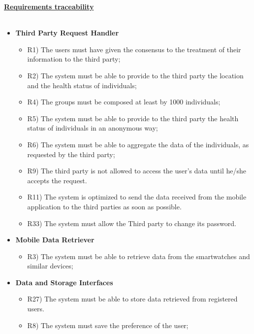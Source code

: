	\underline{\textbf{Requirements traceability}}\\\\
	\begin{itemize}
		\item \textbf{Third Party Request Handler}
		\begin{itemize}
			\item R1) The users must have given the consensus to the treatment of their information to the third party;\\
			\item R2) The system must be able to provide to the third party the location and the health status of individuals;
			\item R4) The groups must be composed at least by 1000 individuals;\\
			\item R5) The system must be able to provide to the third party the health status of individuals in an anonymous way;\\
			\item R6) The system must be able to aggregate the data of the individuals, as requested by the third party;\\
			\item R9) The third party is not allowed to access the user’s data until he/she accepts the request.\\
			\item R11) The system is optimized to send the data received from the mobile application to the third parties as soon as possible.\\
			\item R33) The system must allow the Third party to change its password.\\
		\end{itemize}
		\item \textbf{Mobile Data Retriever}
		\begin{itemize}
			\item R3) The system must be able to retrieve data from the smartwatches and similar devices;\\
		\end{itemize}
		\item \textbf{Data and Storage Interfaces}
		\begin{itemize}
			\item R27) The system must be able to store data retrieved from registered users.\\
			\item R8) The system must save the preference of the user;\\

\end{itemize}
\end{itemize}
